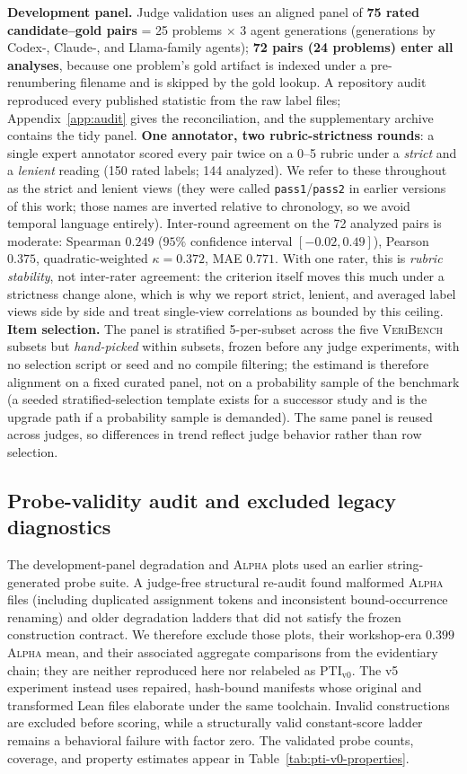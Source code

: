 \documentclass{article}
\newcommand{\PTI}{\mathrm{PTI}}                  %
\newcommand{\PTIvzero}{\PTI_{\mathrm{v0}}}        %
\begin{document}
\textbf{Development panel.}
Judge validation uses an aligned panel of \textbf{75 rated candidate--gold pairs} = 25 problems $\times$ 3 agent generations (generations by Codex-, Claude-, and Llama-family agents); \textbf{72 pairs (24 problems) enter all analyses}, because one problem's gold artifact is indexed under a pre-renumbering filename and is skipped by the gold lookup.
A repository audit reproduced every published statistic from the raw label files; Appendix~\ref{app:audit} gives the reconciliation, and the supplementary archive contains the tidy panel.
\textbf{One annotator, two rubric-strictness rounds}: a single expert annotator scored every pair twice on a 0--5 rubric under a \emph{strict} and a \emph{lenient} reading (150 rated labels; 144 analyzed).
We refer to these throughout as the strict and lenient views (they were called \texttt{pass1}/\texttt{pass2} in earlier versions of this work; those names are inverted relative to chronology, so we avoid temporal language entirely).
Inter-round agreement on the 72 analyzed pairs is moderate: Spearman $0.249$ ($95\%$ confidence interval $[-0.02, 0.49]$), Pearson $0.375$, quadratic-weighted $\kappa = 0.372$, MAE $0.771$.
With one rater, this is \emph{rubric stability}, not inter-rater agreement: the criterion itself moves this much under a strictness change alone, which is why we report strict, lenient, and averaged label views side by side and treat single-view correlations as bounded by this ceiling.
\textbf{Item selection.}
The panel is stratified 5-per-subset across the five \textsc{VeriBench} subsets but \emph{hand-picked} within subsets, frozen before any judge experiments, with no selection script or seed and no compile filtering; the estimand is therefore alignment on a fixed curated panel, not on a probability sample of the benchmark (a seeded stratified-selection template exists for a successor study and is the upgrade path if a probability sample is demanded).
The same panel is reused across judges, so differences in trend reflect judge behavior rather than row selection.

\subsection{Probe-validity audit and excluded legacy diagnostics}\label{sec:sanity}

The development-panel degradation and \textsc{Alpha} plots used an earlier string-generated probe suite. A judge-free structural re-audit found malformed \textsc{Alpha} files (including duplicated assignment tokens and inconsistent bound-occurrence renaming) and older degradation ladders that did not satisfy the frozen construction contract. We therefore exclude those plots, their workshop-era $0.399$ \textsc{Alpha} mean, and their associated aggregate comparisons from the evidentiary chain; they are neither reproduced here nor relabeled as $\PTIvzero$. The v5 experiment instead uses repaired, hash-bound manifests whose original and transformed Lean files elaborate under the same toolchain. Invalid constructions are excluded before scoring, while a structurally valid constant-score ladder remains a behavioral failure with factor zero. The validated probe counts, coverage, and property estimates appear in Table~\ref{tab:pti-v0-properties}.
\end{document}

